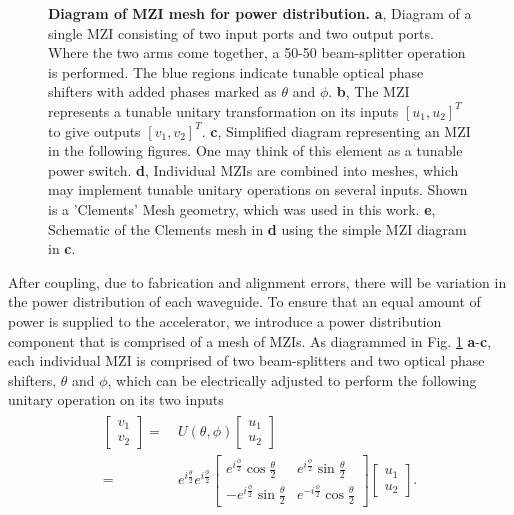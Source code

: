 \begin{figure}
\caption{\label{fig:mesh} \textbf{Diagram of MZI mesh for power distribution.} \textbf{a}, Diagram of a single MZI consisting of two input ports and two output ports.  Where the two arms come together, a 50-50 beam-splitter operation is performed.  The blue regions indicate tunable optical phase shifters with added phases marked as $\theta$ and $\phi$.  \textbf{b}, The MZI represents a tunable unitary transformation on its inputs $[u_1, u_2]^T$ to give outputs $[v_1, v_2]^T$.  \textbf{c}, Simplified diagram representing an MZI in the following figures.  One may think of this element as a tunable power switch. \textbf{d}, Individual MZIs are combined into meshes, which may implement tunable unitary operations on several inputs.  Shown is a 'Clements' Mesh geometry, which was used in this work. \textbf{e}, Schematic of the Clements mesh in \textbf{d} using the simple MZI diagram in \textbf{c}.}
\end{figure}

After coupling, due to fabrication and alignment errors, there will be variation in the power distribution of each waveguide. To ensure that an equal amount of power is supplied to the accelerator, we introduce a power distribution component that is comprised of a mesh of MZIs.  As diagrammed in Fig. \ref{fig:mesh} \textbf{a}-\textbf{c}, each individual MZI is comprised of two beam-splitters and two optical phase shifters, $\theta$ and $\phi$, which can be electrically adjusted to perform the following unitary operation on its two inputs \cite{reck_experimental_1994,clements_optimal_2016,shen_deep_2017,pai2018matrix}
\begin{align}
\begin{split}
    \begin{bmatrix}
      v_1 \\ v_2
    \end{bmatrix}
    =&~U(\theta, \phi) 
    \begin{bmatrix}
      u_1 \\ u_2
    \end{bmatrix}
    \\
    =&~e^{i\frac{\theta}{2}} e^{i\frac{\phi}{2}}
    \begin{bmatrix}
      e^{i\frac{\phi}{2}}\cos{\frac{\theta}{2}} &
      e^{i\frac{\phi}{2}}\sin{\frac{\theta}{2}} \\
      - e^{i\frac{\phi}{2}}\sin{\frac{\theta}{2}} & 
      e^{-i\frac{\phi}{2}}\cos{\frac{\theta}{2}}
    \end{bmatrix}
    \begin{bmatrix}
      u_1 \\ u_2
    \end{bmatrix}.
\end{split}
\label{eq:U}
\end{align}
%

